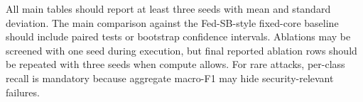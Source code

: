 All main tables should report at least three seeds with mean and standard deviation. The main comparison against the Fed-SB-style fixed-core baseline should include paired tests or bootstrap confidence intervals. Ablations may be screened with one seed during execution, but final reported ablation rows should be repeated with three seeds when compute allows. For rare attacks, per-class recall is mandatory because aggregate macro-F1 may hide security-relevant failures.



